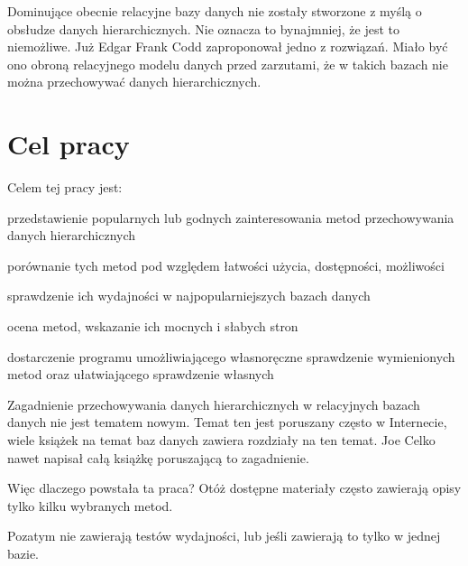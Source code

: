 Dominujące obecnie relacyjne bazy danych nie zostały stworzone z myślą o obsłudze danych hierarchicznych.
Nie oznacza to bynajmniej, że jest to niemożliwe.
Już Edgar Frank Codd zaproponował jedno z rozwiązań.
Miało być ono obroną relacyjnego modelu danych przed zarzutami,
że w takich bazach nie można przechowywać danych hierarchicznych.



\section{Cel pracy}






Celem tej pracy jest:
\begin{itemize*}
    \item przedstawienie popularnych lub godnych zainteresowania metod przechowywania danych hierarchicznych
    \item porównanie tych metod pod względem łatwości użycia, dostępności, możliwości
    \item sprawdzenie ich wydajności w najpopularniejszych bazach danych
    \item ocena metod, wskazanie ich mocnych i słabych stron
    \item dostarczenie programu umożliwiającego własnoręczne sprawdzenie wymienionych metod
        oraz ułatwiającego sprawdzenie własnych
\end{itemize*}


Zagadnienie przechowywania danych hierarchicznych w relacyjnych bazach danych nie jest tematem nowym.
Temat ten jest poruszany często w Internecie,
wiele książek na temat baz danych zawiera rozdziały na ten temat.
Joe Celko nawet napisał całą książkę poruszającą to zagadnienie\cite{celko-tree}.


Więc dlaczego powstała ta praca?
Otóż dostępne materiały często zawierają opisy tylko kilku wybranych metod.

Pozatym nie zawierają testów wydajności, lub jeśli zawierają to tylko w jednej bazie.






